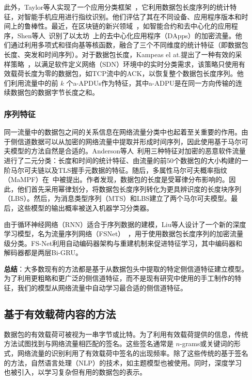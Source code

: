 \documentclass[degree=master,cjk-font=noto]{thuthesis}
\begin{document}
此外，Taylor等人实现了一个应用分类框架~\cite{app_class}，它利用数据包长度序列的统计特征，对智能手机应用进行指纹识别。他们评估了其在不同设备、应用程序版本和时间上的鲁棒性。最近，在区块链的新兴领域~\cite{chen2019tokenscope,EOS20}，如智能合约和去中心化的应用程序，Shen等人~\cite{DApps}识别了以太坊~\cite{8486401}上的去中心化应用程序（DApps）的加密流量。他们通过利用多项式和径向基等核函数，融合了三个不同维度的统计特征（即数据包长度、突发和时间序列）。对于数据包长度，Kampeas el at.提出了一种有效的采样策略~\cite{zero_length}，以满足软件定义网络（SDN）环境中的实时分类需求，该策略只使用有效载荷长度为零的数据包，如TCP流中的ACK，以恢复整个数据包长度序列。他们利用流量中的前 $k$ 个a-APDUs作为特征，其中a-ADPU是在同一方向传输的连续数据包的数据字节长度之和。

\subsubsection{序列特征}

同一流量中的数据包之间的关系信息在网络流量分类中也起着至关重要的作用。由于侧信道数据可以从加密的网络流量中提取并形成时间序列，因此使用基于马尔可夫模型的方法自然是合适的。Anderson等人~\cite{kdd_encrypted_malware}利用三种特征对加密的恶意软件流量进行了二元分类：长度和时间的统计特征、由流量的前50个数据包的大小构建的一阶马尔可夫链以及TLS握手元数据的特征。随后，多属性马尔可夫概率指纹（MaMPF）在~\cite{MaMPF}中被提出。作者发现，数据包的长度是受幂律分布影响的。因此，他们首先采用幂律划分，将数据包长度序列转化为更具辨识度的长度块序列（LBS）。然后，为消息类型序列（MTS）和LBS建立了两个马尔可夫模型。最后，这些模型的输出概率被送入机器学习分类器。

由于循环神经网络（RNN）适合于序列数据的建模，Liu等人设计了一个新的深度学习模型，名为流量序列网络（FSNet）~\cite{fsnet}，用于使用数据包长度序列的加密流量级分类。FS-Net利用自动编码器架构与重建机制来促进特征学习，其中编码器和解码器都是两层Bi-GRU。

\textbf{总结}：大多数现有的方法都是基于从数据包头中提取的特定侧信道特征建立模型。为了利用更粗略和更广泛的侧信道特征，而不是现有研究中使用的手工制作的特征，我们的模型从网络流量中自动学习最合适的侧信道特征。

\subsection{基于有效载荷内容的方法}

数据包的有效载荷可被视为一串字节或比特。为了利用有效载荷提供的信息，传统方法试图找到与网络流量相匹配的签名。这些签名通常是 $n$-grams或关键词的形式，网络流量的识别利用了有效载荷中签名的出现频率。除了这些传统的基于签名的方法，自然语言处理（NLP）的技术，如主题模型也被使用。同时，深度学习也被引入，以学习复杂但有用的数据包的表示。
\end{document}
